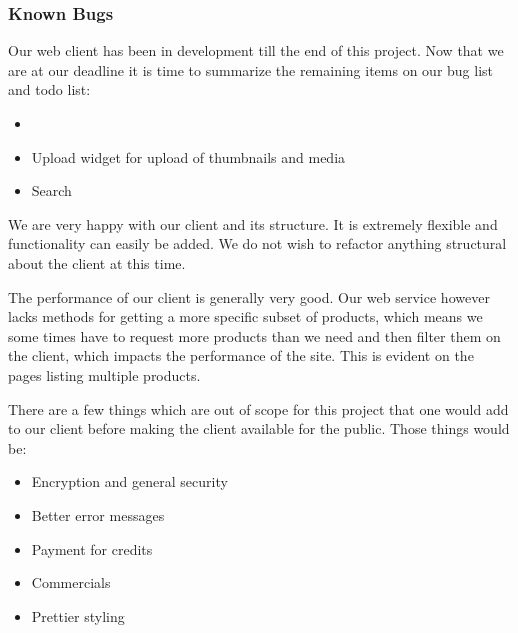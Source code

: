 \subsubsection{Known Bugs}
Our web client has been in development till the end of this project. Now that we are at our deadline it is time to summarize the remaining items on our bug list and todo list:

\begin{itemize}
\item {}
\end{itemize}

\begin{itemize}
\item Upload widget for upload of thumbnails and media
\item Search
\end{itemize}


We are very happy with our client and its structure. It is extremely flexible and functionality can easily be added. We do not wish to refactor anything structural about the client at this time.

The performance of our client is generally very good. Our web service however lacks methods for getting a more specific subset of products, which means we some times have to request more products than we need and then filter them on the client, which impacts the performance of the site. This is evident on the pages listing multiple products.

There are a few things which are out of scope for this project that one would add to our client before making the client available for the public. Those things would be:
\begin{itemize}
\item Encryption and general security
\item Better error messages
\item Payment for credits
\item Commercials
\item Prettier styling
\end{itemize}
